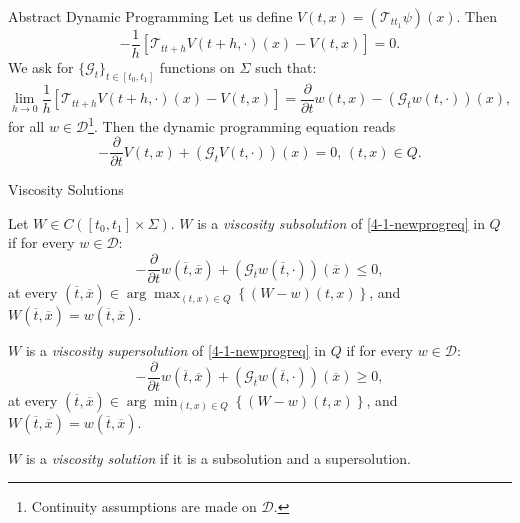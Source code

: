 \documentclass[10pt, compress]{beamer}
\begin{document}
\begin{frame}{Abstract Dynamic Programming}
    Let us define $V(t,x) = (\mathcal{T}_{tt_1}\psi)(x)$. Then
    \[-\frac{1}{h}\left[\mathcal{T}_{tt+h}V(t+h,\cdot)(x)-V(t,x)\right]=0.\]
    We ask for $\{\mathcal{G}_t\}_{t\in[t_0,t_1]}$ functions on $\Sigma$ such that:
\begin{equation}\label{4-1-conditiononG_t}
    \lim_{h\to 0}\frac{1}{h}\left[\mathcal{T}_{tt+h}V(t+h,\cdot)(x)-V(t,x)\right] = \frac{\partial}{\partial t}w(t,x) - (\mathcal{G}_tw(t,\cdot))(x),
\end{equation}
for all $w\in\mathcal{D}$\footnote{Continuity assumptions are made on $\mathcal{D}$.}. Then the dynamic programming equation reads
\begin{equation}\label{4-1-newprogreq}
    -\frac{\partial }{\partial t}V(t,x) + (\mathcal{G}_tV(t,\cdot))(x) = 0,\,(t,x)\in Q.
\end{equation}
\end{frame}

\begin{frame}{Viscosity Solutions}
\vspace{-5mm}
    \begin{definition}\label{4-1-defviscsol}
    Let $W\in C([t_0,t_1]\times\Sigma)$. $W$ is a \textit{viscosity subsolution} of \ref{4-1-newprogreq} in $Q$ if for every $w\in\mathcal{D}$:
    \begin{equation}\label{4-1-defsubsolution}
         -\frac{\partial}{\partial t}w\left(\overline{t},\overline{x}\right) + \left(\mathcal{G}_{\overline{t}}w\left(\overline{t},\cdot\right)\right)\left(\overline{x}\right) \leq 0,
    \end{equation} 
    at every $\left(\overline{t},\overline{x}\right)\in \arg \max_{(t,x)\in Q}\left\{(W-w)(t,x)\right\}$, and $W\left(\overline{t},\overline{x}\right)=w\left(\overline{t},\overline{x}\right)$.
        
    $W$ is a \textit{viscosity supersolution} of \ref{4-1-newprogreq} in $Q$ if for every $w\in\mathcal{D}$:
    \begin{equation}\label{4-1-defsupersolution}
        -\frac{\partial}{\partial t}w\left(\overline{t},\overline{x}\right) + \left(\mathcal{G}_{\overline{t}}w\left(\overline{t},\cdot\right)\right)\left(\overline{x}\right) \geq 0,
    \end{equation} 
    at every $\left(\overline{t},\overline{x}\right)\in \arg \min_{(t,x)\in Q}\left\{(W-w)(t,x)\right\}$, and $W\left(\overline{t},\overline{x}\right)=w\left(\overline{t},\overline{x}\right)$.
    \vspace{5mm}  
    
    $W$ is a \textit{viscosity solution} if it is a subsolution and a supersolution.
\end{definition}
\end{frame}
\end{document}
